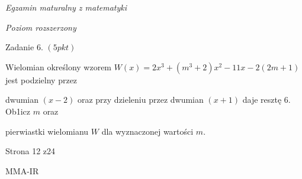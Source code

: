 \documentclass[a4paper,12pt]{article}
\begin{document}
{\it Egzamin maturalny z matematyki}

{\it Poziom rozszerzony}

Zadanie 6. $(5pkt)$

Wielomian określony wzorem $W(x)=2x^{3}+(m^{3}+2)x^{2}-11x-2(2m+1)$ jest podzielny przez

dwumian $(x-2)$ oraz przy dzieleniu przez dwumian $(x+1)$ daje resztę 6. Ob1icz $m$ oraz

pierwiastki wielomianu $W$ dla wyznaczonej wartości $m.$

Strona 12 z24

MMA-IR
\end{document}
